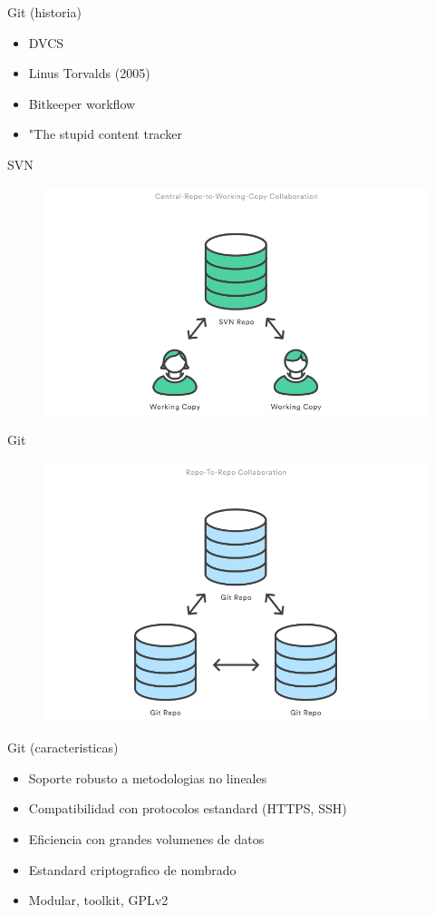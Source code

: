 \documentclass{beamer}
\begin{document}
\begin{frame}{Git (historia)}
	\begin{itemize}
		\item DVCS
		\item Linus Torvalds (2005)
		\item Bitkeeper workflow
		\item "The stupid content tracker
	\end{itemize}
\end{frame}


\begin{frame}{SVN}
\begin{figure}
\centering
\includegraphics[width=0.7\linewidth]{Images/svn}
\end{figure}
\end{frame}

\begin{frame}{Git}
\begin{figure}
\centering
\includegraphics[width=0.7\linewidth]{Images/git}
\end{figure}
\end{frame}



\begin{frame}{Git (caracteristicas)}
	\begin{itemize}
		\item Soporte robusto a metodologias no lineales
		\item Compatibilidad con protocolos estandard (HTTPS, SSH)
		\item Eficiencia con grandes volumenes de datos
		\item Estandard criptografico de nombrado
		\item Modular, toolkit, GPLv2
	\end{itemize}
\end{frame}
\end{document}
